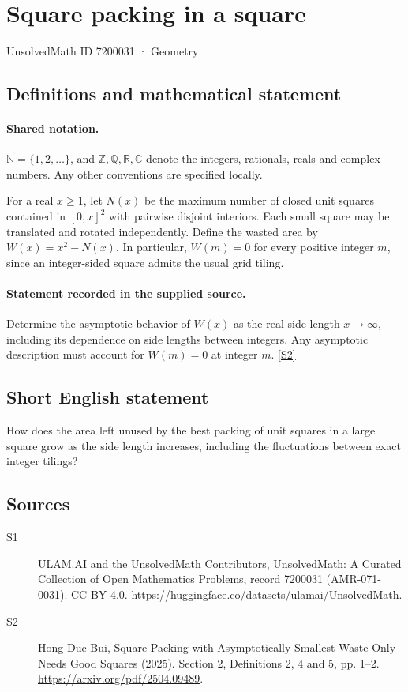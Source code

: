 \documentclass[11pt]{article}
\newcommand{\sref}[2]{\hyperlink{source:#1:#2}{[S#2]}}
\begin{document}
\setcounter{section}{7200030}
\section{Square packing in a square}\label{7200031}
{\small\sffamily UnsolvedMath ID 7200031 · Geometry}
\subsection{Definitions and mathematical statement}

\paragraph{Shared notation.}$\mathbb N=\{1,2,\ldots\}$, and $\mathbb Z,\mathbb Q,\mathbb R,\mathbb C$ denote the integers, rationals, reals and complex numbers. Any other conventions are specified locally.


For a real $x\geq1$, let $N(x)$ be the maximum number of closed unit squares contained in $[0,x]^2$ with pairwise disjoint interiors. Each small square may be translated and rotated independently. Define the wasted area by $W(x)=x^2-N(x)$. In particular, $W(m)=0$ for every positive integer $m$, since an integer-sided square admits the usual grid tiling.
\paragraph{Statement recorded in the supplied source.}
Determine the asymptotic behavior of $W(x)$ as the real side length $x\to\infty$, including its dependence on side lengths between integers. Any asymptotic description must account for $W(m)=0$ at integer $m$. \sref{7200031}{2}
\subsection{Short English statement}
How does the area left unused by the best packing of unit squares in a large square grow as the side length increases, including the fluctuations between exact integer tilings?
\subsection{Sources}
\begin{description}
\item[\hypertarget{source:7200031:1}{S1}] ULAM.AI and the UnsolvedMath Contributors, UnsolvedMath: A Curated Collection of Open Mathematics Problems, record 7200031 (AMR-071-0031). CC BY 4.0. \url{https://huggingface.co/datasets/ulamai/UnsolvedMath}.
\item[\hypertarget{source:7200031:2}{S2}] Hong Duc Bui, Square Packing with Asymptotically Smallest Waste Only Needs Good Squares (2025). Section 2, Definitions 2, 4 and 5, pp. 1–2. \url{https://arxiv.org/pdf/2504.09489}.
\end{description}
\label{end:7200031}
\end{document}

